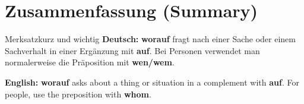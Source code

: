 \documentclass[a4paper,11pt]{article}
\newcommand{\GermanText}[1]{\textbf{Deutsch: }#1\par}
\newcommand{\EnglishText}[1]{{\small\color{SoftGray}\textbf{English: }#1\par}}
\begin{document}
\section{Zusammenfassung (Summary)}
\begin{grammarentry}{Merksatz}{kurz und wichtig}
\GermanText{\textbf{worauf} fragt nach einer Sache oder einem Sachverhalt in einer Ergänzung mit \textbf{auf}. Bei Personen verwendet man normalerweise die Präposition mit \textbf{wen/wem}.}
\EnglishText{\textbf{worauf} asks about a thing or situation in a complement with \textbf{auf}. For people, use the preposition with \textbf{whom}.}
\end{grammarentry}
\end{document}
